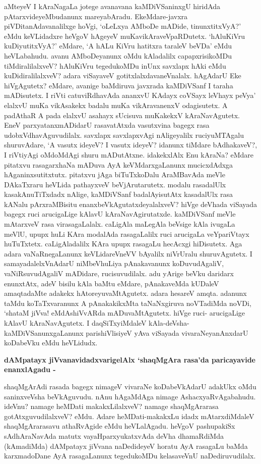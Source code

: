 \noindent
aMteyeV I kAraNagaLa jotege avanavana kaMDiVSaninxgU hiridAda pAtarxvideyeMbudanunx mareyabAradu. EkeMdare-javxra piVDitanAdavanalilxge hoVgi, `oLeLxya AMboDe mADide, tinunxtitxVyA?' eMdu keVLidadxre heVgoV hAgeyeV muKavikAraveVpaRDutetx. `hAluKiVru kuDiyutitxVyA?' eMdare, `A hALu KiVru hatitxra taraleV beVDa' eMdu heVLabahudu. avanu AMboDeyanunx oMdu kAladalilx capapxrisikoMDu tiMdiralilalxveV? hAluKiVru tegedukoMDu inUnx savxlapx hAki eMdu kuDidiralilalxveV? adara viSayaveV gotitxlalxdavaneVnalalx. hAgAdarU Eke hiVgAgutetx? eMdare, avanige baMdiruva javxrada kaMDiVSanf I taraha mADisutetx. I riVti catuviRdhavAda ananxvU KAdayx coVSayx leVhayx peVya' elalxvU muKa vikAsakekx badalu muKa vikAravanenxV odagisutetx. A padAthaR A pada elalxvU asahayx sUcisuva muKakekxV kAraNavAgutetx. EneV parxyatanxmADidarU rasavatAtxda vasutxvina bagegx rasa udobxVdhavAguvudilalx. savxlapx savxlapxvAgi nAligeyalilx ruciyuMTAgalu shuruvAdare, `A vasutx ideyeV? I vasutx ideyeV? idanunx tiMdare bAdhakaveV?, I riVtiyAgi oMdoMdAgi shuru mADutAtxne. idakekxlAlx Enu kAraNa? eMdare pitatxvu rasagarxhaNa mADuva AyA keVMdarxgaLanunx mucicxdAdxga hAganinxsutitxtutx. pitatxvu jAga biTuTxkoDalu AraMBavAda meVle DAkaTxraru heVLida pathayxveV beVjArutarutetx. modalu rasadalUlx kasakAnuTiTxdadx nAlige, kaMDiVSanf badalAyisutAtx kasadalUlx rasa kANalu pArxraMBisitu enanxbeVkAgutatxdeyalalxveV? hiVge deVhada viSayada bagegx ruci arucigaLige kAlavU kAraNavAgirutatxde. kaMDiVSanf meVle mAtarxveV rasa virasagaLalalx. caLigAla maLegAla beVsige kAla ivugaLa meVlU, upupx huLi KAra modalAda rasagaLalilx ruci arucigaLa veYpariVtayx huTuTxtetx. caLigAladalilx KAra upupx rasagaLu hecAcxgi hiDisutetx. Aga adara vaNaRnegaLanunx keVLidareVneVV bAyalilx niVrUralu shuruvAgutetx. I samayadalelxVnAdarU niMbeVhuLiya pAnakavanunx koDuvudAgaliV, vaNiRsuvudAgaliV mADidare, rucisuvudilalx. adu yArige beVku daridarx enunxtAtx, adeV bisilu kAla baMtu eMdare, pAnakaveMda kUDaleV amaqtadaMte adakekx hAtoreyuvaMtAgutetx. adara hesareV amqta. adanunx taMdu koTaTxvaranunx A pAnakakikxMta taNaNxgiruva noVTadiMda noVDi, `shataM jiVva! eMdAshiVvARda mADuvaMtAgutetx. hiVge ruci- arucigaLige kAlavU kAraNavAgutetx. I daqSiTxyiMdaleV kAla-deVsha-kaMDiVSanunxgaLanunx parishiVlisiyeV yAva viSayada vivaraNeyanAnxdarU koDabeVku eMdu heVLidudx.

{\bigskip
\noindent
{\large\bf dAMpatayx jiVvanavidadxvarigelAlx `shaqMgAra rasa'da paricayavide enanxlAgadu -}}\label{page221}
\medskip

\noindent
shaqMgArAdi rasada bagegx nimageV vivaraNe koDabeVkAdarU adakUkx oMdu saninxveVsha beVkAguvudu. nAnu hAgaMdAga nimage AshacxyaRvAgabahudu. ideVnu? namage heMDati makakxLilalxveV? namage shaqMgArarasa gotAtxguvudilalxveV? eMdu. Adare heMDati-makakxLu idadx mAtarxdiMdaleV shaqMgArarasavu athaRvAgide eMdu heVLalAgadu. heVgoV pashupakiSx sAdhAraNavAda matutx vayaHparxyukatxvAda \hbox{deVha} dhamaRdiMda (kAmadiMda) dAMpatayx jiVvana naDedideyeV horatu AyA rasagaLu baMda karxmadoDane AyA rasagaLanunx tegedukoMDu kelasaveVnU naDediruvudilalx.

